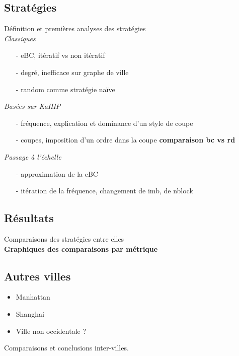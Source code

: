 \documentclass{article}
\begin{document}
\subsection{Stratégies}

    Définition et premières analyses des stratégies\\
    \emph{Classiques}
    \begin{itemize}
        \item[-] eBC, itératif vs non itératif
        \item[-] degré, inefficace sur graphe de ville
        \item[-] random comme stratégie naïve 
    \end{itemize}
    \emph{Basées sur KaHIP}
    \begin{itemize}
        \item[-] fréquence, explication et dominance d'un style de coupe
        \item[-] coupes, imposition d'un ordre dans la coupe \textbf{comparaison bc vs rd}
    \end{itemize}
    \emph{Passage à l'échelle}
    \begin{itemize}
        \item[-] approximation de la eBC
        \item[-] itération de la fréquence, changement de imb, de nblock
    \end{itemize}
\subsection{Résultats}
Comparaisons des stratégies entre elles\\
\textbf{Graphiques des comparaisons par métrique}

\subsection{Autres villes}
\begin{itemize}
    \item Manhattan
    \item Shanghai
    \item Ville non occidentale ?
\end{itemize}
Comparaisons et conclusions inter-villes.
\end{document}
